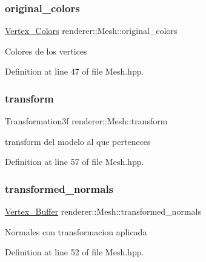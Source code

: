\subsubsection{\texorpdfstring{original\_colors}{original\_colors}}
{\footnotesize\ttfamily \mbox{\hyperlink{classrenderer_1_1_mesh_ab384ccca7ccccac4b935fe797ce0a7ea}{Vertex\+\_\+\+Colors}} renderer\+::\+Mesh\+::original\+\_\+colors\hspace{0.3cm}{\ttfamily [private]}}

Colores de los vertices 

Definition at line 47 of file Mesh.\+hpp.

\mbox{\label{classrenderer_1_1_mesh_a6d4a64b911980ccd50a4fc54830ce653}} 
\subsubsection{\texorpdfstring{transform}{transform}}
{\footnotesize\ttfamily Transformation3f renderer\+::\+Mesh\+::transform\hspace{0.3cm}{\ttfamily [private]}}

transform del modelo al que perteneces 

Definition at line 57 of file Mesh.\+hpp.

\mbox{\label{classrenderer_1_1_mesh_a17a0e6c0c5d85b761ae43ec601a346ea}} 
\subsubsection{\texorpdfstring{transformed\_normals}{transformed\_normals}}
{\footnotesize\ttfamily \mbox{\hyperlink{classrenderer_1_1_mesh_a8c848a95f65fb25f6dc94dcb8879cf8b}{Vertex\+\_\+\+Buffer}} renderer\+::\+Mesh\+::transformed\+\_\+normals\hspace{0.3cm}{\ttfamily [private]}}

Normales con transformacion aplicada 

Definition at line 52 of file Mesh.\+hpp.

\mbox{\label{classrenderer_1_1_mesh_a670137619aeda905f64bc784265ccbe5}} 
